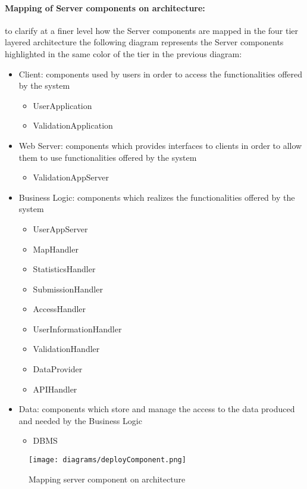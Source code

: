 \paragraph{Mapping of Server components on architecture:}to clarify at a finer level how the Server components are mapped in the four tier layered architecture the following diagram represents the Server components highlighted in the same color of the tier in the previous diagram:
\begin{itemize}
	\item Client: components used by users in order to access the functionalities offered by the system
		\begin{itemize}
			\item UserApplication
			\item ValidationApplication
		\end{itemize}
	\item Web Server: components which provides interfaces to clients in order to allow them to use functionalities offered by the system
		\begin{itemize}
			\item ValidationAppServer
		\end{itemize}
	\item Business Logic: components which realizes the functionalities offered by the system
		\begin{itemize}
			\item UserAppServer
			\item MapHandler
			\item StatisticsHandler
			\item SubmissionHandler
			\item AccessHandler
			\item UserInformationHandler
			\item ValidationHandler
			\item DataProvider
			\item APIHandler
		\end{itemize}
	\item Data: components which store and manage the access to the data produced and needed by the Business Logic
		\begin{itemize}
			\item DBMS \newline\newline
		\end{itemize}
\end{itemize}

\begin{figure}[h]
			\centering
			\texttt{[image: diagrams/deployComponent.png]}
			\caption{
				\label{fig:deployServerComponent} 
				Mapping server component on architecture
			}
		\end{figure}
\clearpage

